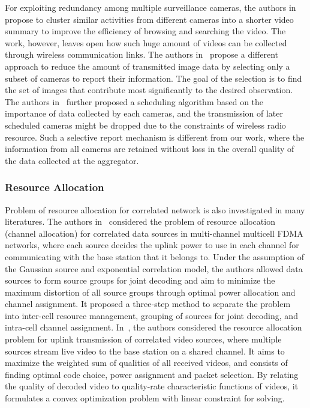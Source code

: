 For exploiting redundancy among multiple surveillance cameras, the authors in~\cite{ClusteredSynopsis} propose to cluster similar activities from different cameras into a shorter video summary to improve the efficiency of browsing and searching the video.
The work, however, leaves open how such huge amount of videos can be collected through wireless communication links.
The authors in~\cite{CameraSelection} propose a different approach to reduce the amount of transmitted image data by selecting only a subset of cameras to report their information.
The goal of the selection is to find the set of images that contribute most significantly to the desired observation.
The authors in~\cite{CorrAwareScheduling} further proposed a scheduling algorithm based on the importance of data collected by each cameras, and the transmission of later scheduled cameras might be dropped due to the constraints of wireless radio resource.
Such a selective report mechanism is different from our work, where the information from all cameras are retained without loss in the overall quality of the data collected at the aggregator.
%
\subsubsection{Resource Allocation}
Problem of resource allocation for correlated network is also investigated in many literatures.
The authors in~\cite{CorrelationAwareRA} considered the problem of resource allocation (channel allocation) for correlated data sources in multi-channel multicell FDMA networks, where each source decides the uplink power to use in each channel for communicating with the base station that it belongs to.
Under the assumption of the Gaussian source and exponential correlation model, the authors allowed data sources to form source groups for joint decoding and aim to minimize the maximum distortion of all source groups through optimal power allocation and channel assignment.
It proposed a three-step method to separate the problem into inter-cell resource management, grouping of sources for joint decoding, and intra-cell channel assignment.
In~\cite{AdaptiveCrossLayerRA}, the authors considered the resource allocation problem for uplink transmission of correlated video sources, where multiple sources stream live video to the base station on a shared channel.
It aims to maximize the weighted sum of qualities of all received videos, and consists of finding optimal code choice, power assignment and packet selection.
By relating the quality of decoded video to quality-rate characteristic functions of videos, it formulates a convex optimization problem with linear constraint for solving.
%
